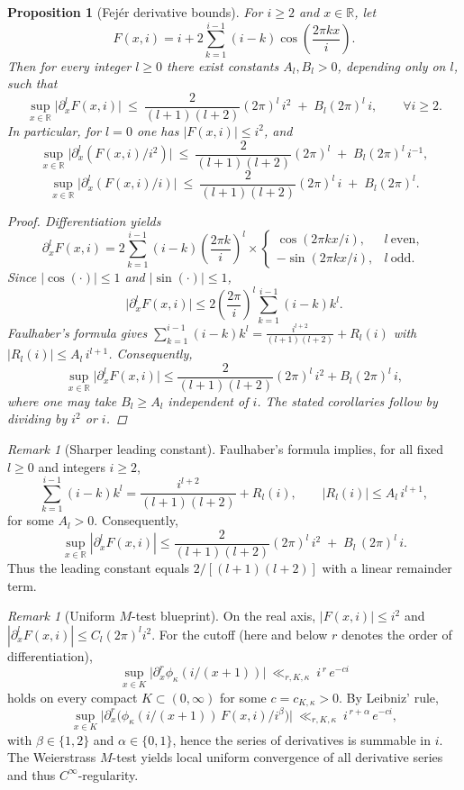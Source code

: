\documentclass[11pt,a4paper]{amsart}
\newcommand{\R}{\mathbb{R}}
\theoremstyle{plain}
\newtheorem{proposition}[theorem]{Proposition}
\theoremstyle{definition}
\theoremstyle{remark}
\newtheorem{remark}[theorem]{Remark}
\begin{document}
\begin{proposition}[Fejér derivative bounds]\label{prop:fejer-bounds}
For $i\ge2$ and $x\in\R$, let
\[
F(x,i)= i + 2\sum_{k=1}^{i-1}(i-k)\cos\!\left(\frac{2\pi k x}{i}\right).
\]
Then for every integer $l\ge0$ there exist constants $A_l,B_l>0$, depending only on $l$, such that
\[
\sup_{x\in\R}\bigl| \partial_x^l F(x,i) \bigr|
\ \le\ \frac{2}{(l+1)(l+2)}(2\pi)^l\,i^{2}\;+\;B_l(2\pi)^l\,i,
\qquad \forall i\ge2.
\]
In particular, for $l=0$ one has $|F(x,i)|\le i^2$, and
\[
\sup_{x\in\R}\bigl| \partial_x^l (F(x,i)/i^2) \bigr| \ \le\ \frac{2}{(l+1)(l+2)}(2\pi)^l\;+\;B_l(2\pi)^l\,i^{-1},
\]
\[
\sup_{x\in\R}\bigl| \partial_x^l (F(x,i)/i) \bigr| \ \le\ \frac{2}{(l+1)(l+2)}(2\pi)^l\,i\;+\;B_l(2\pi)^l.
\]
\begin{proof}
Differentiation yields
\[
\partial_x^l F(x,i)=2\sum_{k=1}^{i-1}(i-k)\left(\frac{2\pi k}{i}\right)^{\!l}
\!\times\!
\begin{cases}
\cos(2\pi k x/i), & l\ \text{even},\\
-\sin(2\pi k x/i), & l\ \text{odd}.
\end{cases}
\]
Since $|\cos(\cdot)|\le 1$ and $|\sin(\cdot)|\le 1$,
\[
\bigl|\partial_x^l F(x,i)\bigr|
\le 2\left(\frac{2\pi}{i}\right)^{\!l}\sum_{k=1}^{i-1}(i-k)k^l.
\]
Faulhaber's formula gives $\sum_{k=1}^{i-1}(i-k)k^l=\frac{i^{l+2}}{(l+1)(l+2)}+R_l(i)$ with $|R_l(i)|\le A_l\,i^{l+1}$. Consequently,
\[
\sup_{x\in\R}\bigl|\partial_x^l F(x,i)\bigr|
\le \frac{2}{(l+1)(l+2)}(2\pi)^l\,i^{2}+B_l(2\pi)^l\,i,
\]
where one may take $B_l\ge A_l$ independent of $i$. The stated corollaries follow by dividing by $i^2$ or $i$.
\end{proof}
\end{proposition}

\begin{remark}[Sharper leading constant]
Faulhaber’s formula implies, for all fixed $l\ge 0$ and integers $i\ge 2$,
\[
\sum_{k=1}^{i-1}(i-k)k^l=\frac{i^{l+2}}{(l+1)(l+2)}+R_{l}(i),\qquad |R_{l}(i)|\le A_l\,i^{l+1},
\]
for some $A_l>0$. Consequently,
\[
\sup_{x\in\mathbb{R}}|\partial_x^l F(x,i)|
\le \frac{2}{(l+1)(l+2)}(2\pi)^l\, i^{2}\;+\;B_l\,(2\pi)^l\, i.
\]
Thus the leading constant equals $2/[(l+1)(l+2)]$ with a linear remainder term.
\end{remark}


\begin{remark}[Uniform $M$-test blueprint]\label{rem:mtest-blueprint}
On the real axis, $|F(x,i)|\le i^2$ and $|\partial_x^l F(x,i)|\le C_l(2\pi)^l i^2$. For the cutoff (here and below $r$ denotes the order of differentiation),
\[
\sup_{x\in K}\bigl|\partial_x^r \phi_\kappa(i/(x{+}1))\bigr|\ \ll_{r,K,\kappa}\ i^{\,r}\,e^{-c i}
\]
holds on every compact $K\subset(0,\infty)$ for some $c=c_{K,\kappa}>0$. By Leibniz' rule,
\[
\sup_{x\in K}\bigl|\partial_x^r\bigl(\phi_\kappa(i/(x{+}1))\,F(x,i)/i^\beta\bigr)\bigr|\ \ll_{r,K,\kappa}\ i^{\,r+\alpha}\,e^{-c i},
\]
with $\beta\in\{1,2\}$ and $\alpha\in\{0,1\}$, hence the series of derivatives is summable in $i$. The Weierstrass $M$-test yields local uniform convergence of all derivative series and thus $C^\infty$-regularity.
\end{remark}
\end{document}
